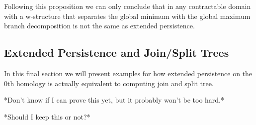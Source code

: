 Following this proposition we can only conclude that in any contractable domain with a w-structure that separates the global minimum with the global maximum branch decomposition is not the same as extended persistence.

\subsection{Extended Persistence and Join/Split Trees}

In this final section we will present examples for how extended persistence on the 0th homology is actually equivalent to computing join and split tree.

*Don't know if I can prove this yet, but it probably won't be too hard.*

*Should I keep this or not?*








